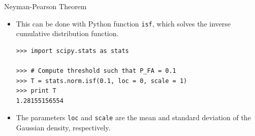 \documentclass[10pt, aspectratio=169]{beamer} %
\begin{document}
\begin{frame}[allowframebreaks=0.8,fragile]
 {Neyman-Pearson Theorem}

\begin{itemize}
\item This can be done with Python function \texttt{isf}, which solves
the inverse cumulative distribution function.

\begin{lstlisting}
>>> import scipy.stats as stats

>>> # Compute threshold such that P_FA = 0.1
>>> T = stats.norm.isf(0.1, loc = 0, scale = 1)
>>> print T
1.28155156554
\end{lstlisting}

\item The parameters \verb+loc+ and \verb+scale+ are the mean and standard
deviation of the Gaussian density, respectively.

\end{itemize}

\end{frame}
\end{document}
